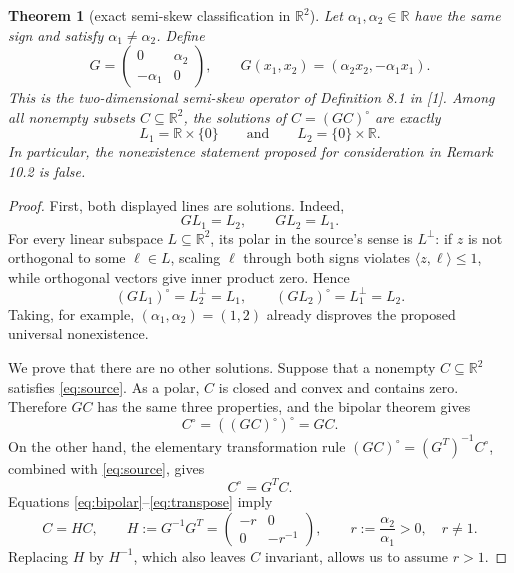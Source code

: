 \documentclass[11pt]{article}
\newtheorem{theorem}{Theorem}
\newcommand{\R}{\mathbb R}
\newcommand{\polar}{^{\circ}}
\begin{document}
\begin{theorem}[exact semi-skew classification in \(\R^2\)]\label{thm:main}
Let \(\alpha_1,\alpha_2\in\R\) have the same sign and satisfy
\(\alpha_1\ne\alpha_2\).  Define
\[
 G=\begin{pmatrix}0&\alpha_2\\-\alpha_1&0\end{pmatrix},
 \qquad
 G(x_1,x_2)=(\alpha_2x_2,-\alpha_1x_1).
\]
This is the two-dimensional semi-skew operator of Definition 8.1 in [1].
Among all nonempty subsets \(C\subseteq\R^2\), the solutions of
\(C=(GC)\polar\) are exactly
\[
 L_1=\R\times\{0\}
 \qquad\text{and}\qquad
 L_2=\{0\}\times\R.
\]
In particular, the nonexistence statement proposed for consideration in
Remark 10.2 is false.
\end{theorem}

\begin{proof}
First, both displayed lines are solutions.  Indeed,
\[
 GL_1=L_2,\qquad GL_2=L_1.
\]
For every linear subspace \(L\subseteq\R^2\), its polar in the source's sense
is \(L^\perp\): if \(z\) is not orthogonal to some \(\ell\in L\), scaling
\(\ell\) through both signs violates \(\langle z,\ell\rangle\le1\), while
orthogonal vectors give inner product zero.  Hence
\[
 (GL_1)\polar=L_2^\perp=L_1,\qquad
 (GL_2)\polar=L_1^\perp=L_2.
\]
Taking, for example, \((\alpha_1,\alpha_2)=(1,2)\) already disproves the
proposed universal nonexistence.

We prove that there are no other solutions.  Suppose that a nonempty
\(C\subseteq\R^2\) satisfies \eqref{eq:source}.  As a polar, \(C\) is closed
and convex and contains zero.  Therefore \(GC\) has the same three
properties, and the bipolar theorem gives
\begin{equation}\label{eq:bipolar}
 C\polar=((GC)\polar)\polar=GC.
\end{equation}
On the other hand, the elementary transformation rule
\((GC)\polar=(G^T)^{-1}C\polar\), combined with
\eqref{eq:source}, gives
\begin{equation}\label{eq:transpose}
 C\polar=G^TC.
\end{equation}
Equations \eqref{eq:bipolar}--\eqref{eq:transpose} imply
\[
 C=HC,\qquad
 H:=G^{-1}G^T
   =\begin{pmatrix}
      -r&0\\0&-r^{-1}
     \end{pmatrix},
 \qquad r:=\frac{\alpha_2}{\alpha_1}>0,\quad r\ne1.
\]
Replacing \(H\) by \(H^{-1}\), which also leaves \(C\) invariant, allows us
to assume \(r>1\).


\end{proof}
\end{document}
